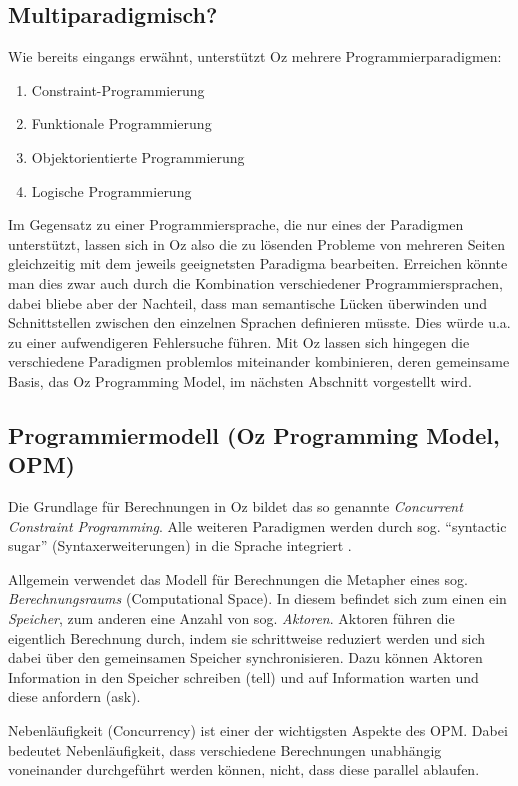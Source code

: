 \subsection{Multiparadigmisch?}
Wie bereits eingangs erwähnt, unterstützt Oz mehrere Programmierparadigmen:

\begin{enumerate}
  \item Constraint-Programmierung
  \item Funktionale Programmierung
  \item Objektorientierte Programmierung
  \item Logische Programmierung
\end{enumerate}
  
Im Gegensatz zu einer Programmiersprache, die nur eines der Paradigmen 
unterstützt, lassen sich in Oz also die zu lösenden Probleme von mehreren 
Seiten gleichzeitig mit dem jeweils geeignetsten Paradigma bearbeiten. 
Erreichen könnte man dies zwar auch durch die Kombination verschiedener 
Programmiersprachen, dabei bliebe aber der Nachteil, dass man semantische 
Lücken überwinden und Schnittstellen zwischen den einzelnen Sprachen definieren 
müsste. Dies würde u.a. zu einer aufwendigeren Fehlersuche führen. Mit Oz 
lassen sich hingegen die verschiedene Paradigmen problemlos miteinander 
kombinieren, deren gemeinsame Basis, das Oz Programming Model, im nächsten 
Abschnitt vorgestellt wird.

\subsection{Programmiermodell (Oz Programming Model, OPM)}
Die Grundlage für Berechnungen in Oz bildet das so genannte \textsl{Concurrent 
Constraint Programming}. Alle weiteren Paradigmen werden durch sog. "`syntactic 
sugar"' (Syntaxerweiterungen) in die Sprache integriert \cite{KI-LP96}.

Allgemein verwendet das Modell für Berechnungen die Metapher eines sog. 
\textsl{Berechnungsraums} (Computational Space). In diesem befindet sich zum 
einen ein \textsl{Speicher}, zum anderen eine Anzahl von sog. \textsl{Aktoren}. 
Aktoren führen die eigentlich Berechnung durch, indem sie schrittweise 
reduziert werden und sich dabei über den gemeinsamen Speicher synchronisieren. 
Dazu können Aktoren Information in den Speicher schreiben (tell) und auf 
Information warten und diese anfordern (ask).

Nebenläufigkeit (Concurrency) ist einer der wichtigsten Aspekte des OPM. Dabei 
bedeutet Nebenläufigkeit, dass verschiedene Berechnungen unabhängig voneinander 
durchgeführt werden können, nicht, dass diese parallel ablaufen.
